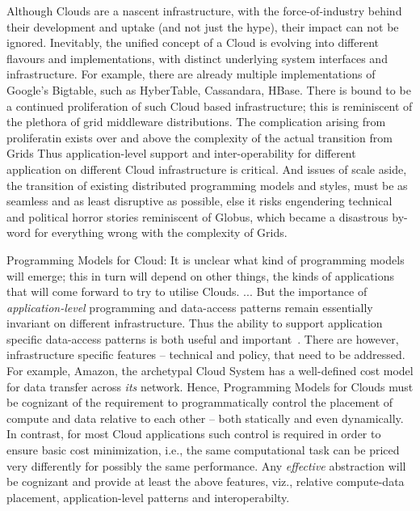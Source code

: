 \documentclass[conference,final]{IEEEtran}
\begin{document}
Although Clouds are a nascent infrastructure, with the
force-of-industry behind their development and uptake (and not just
the hype), their impact can not be ignored.  %
Inevitably, the unified concept of a Cloud is evolving into different
flavours and implementations, with distinct underlying system
interfaces and infrastructure. For example, there are already multiple
implementations of Google's Bigtable, such as HyberTable, Cassandara,
HBase. There is bound to be a continued proliferation of such Cloud
based infrastructure; this is reminiscent of the plethora of grid
middleware distributions. The complication arising from proliferatin
exists over and above the complexity of the actual transition from
Grids Thus application-level support and inter-operability for
different application on different Cloud infrastructure is
critical. And issues of scale aside, the transition of existing
distributed programming models and styles, must be as seamless and as
least disruptive as possible, else it risks engendering technical and
political horror stories reminiscent of Globus, which became a
disastrous by-word for everything wrong with the complexity of Grids.

Programming Models for Cloud: It is unclear what kind of programming
models will emerge; this in turn will depend on other things, the
kinds of applications that will come forward to try to utilise Clouds.
...  But the importance of {\it application-level} programming and
data-access patterns remain essentially invariant on different
infrastructure. Thus the ability to support application specific
data-access patterns is both useful and important~\cite{dpa-paper}.
There are however, infrastructure specific features -- technical and
policy, that need to be addressed. For example, Amazon, the archetypal
Cloud System has a well-defined cost model for data transfer across
{\it its} network. Hence, Programming Models for Clouds must be
cognizant of the requirement to programmatically control the placement
of compute and data relative to each other -- both statically and even
dynamically.  %
In contrast, for most Cloud applications such control is required in
order to ensure basic cost minimization, i.e., the same computational
task can be priced very differently for possibly the same performance.
Any {\it effective} abstraction will be cognizant and provide at least
the above features, viz., relative compute-data placement,
application-level patterns and interoperabilty.
\end{document}
